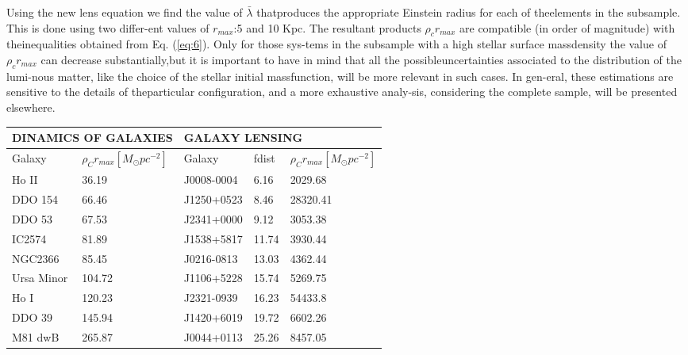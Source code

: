 \documentclass[10pt,a4paper]{article}
\begin{document}
\begin{multicols}{2}
Using the new lens equation we find the value of $\bar{\lambda}$ thatproduces the appropriate Einstein radius for each of theelements in the subsample.  This is done using two differ-ent values of $r_{max}$:5 and 10 Kpc.  The resultant products \(\rho_{c}r_{max}\) are compatible (in order of magnitude) with theinequalities obtained from Eq.  (\ref{eq:6}).  Only for those sys-tems in the subsample with a high stellar surface massdensity  the  value  of $\rho_{c}r_{max}$ can  decrease  substantially,but it is important to have in mind that all the possibleuncertainties associated to the distribution of the lumi-nous  matter,  like  the  choice  of  the  stellar  initial  massfunction,  will  be  more  relevant  in  such  cases.   In  gen-eral, these estimations are sensitive to the details of theparticular  configuration,  and  a  more  exhaustive  analy-sis,  considering  the  complete  sample,  will  be  presented elsewhere.

\end{multicols}

\begin{table}[h!]
	\centering
	\begin{tabular}{|l|l|l|l|l|} 
		\hline
		\multicolumn{2}{|l|}{\textbf{\centering DINAMICS OF GALAXIES}} & \multicolumn{3}{l|}{\textbf{\centering GALAXY LENSING}}  \\ 
		\hline
		Galaxy     & \(\rho_{C}r_{max}[M_{\odot}pc^{-2}]\)                          & Galaxy     & fdist & \(\rho_{C}r_{max}[M_{\odot}pc^{-2}]\)              \\ 
		\hline
		Ho II      & 36.19                         & J0008-0004 & 6.16  & 2029.68         \\ 
		\hline
		DDO 154    & 66.46                         & J1250+0523 & 8.46  & 28320.41        \\ 
		\hline
		DDO 53     & 67.53                         & J2341+0000 & 9.12  & 3053.38         \\ 
		\hline
		IC2574     & 81.89                         & J1538+5817 & 11.74 & 3930.44         \\ 
		\hline
		NGC2366    & 85.45                         & J0216-0813 & 13.03 & 4362.44         \\ 
		\hline
		Ursa Minor & 104.72                        & J1106+5228 & 15.74 & 5269.75         \\ 
		\hline
		Ho I       & 120.23                        & J2321-0939 & 16.23 & 54433.8         \\ 
		\hline
		DDO 39     & 145.94                        & J1420+6019 & 19.72 & 6602.26         \\ 
		\hline
		M81 dwB    & 265.87                        & J0044+0113 & 25.26 & 8457.05         \\
		\hline
	\end{tabular}
\end{table} \label{table:1}
\end{document}
